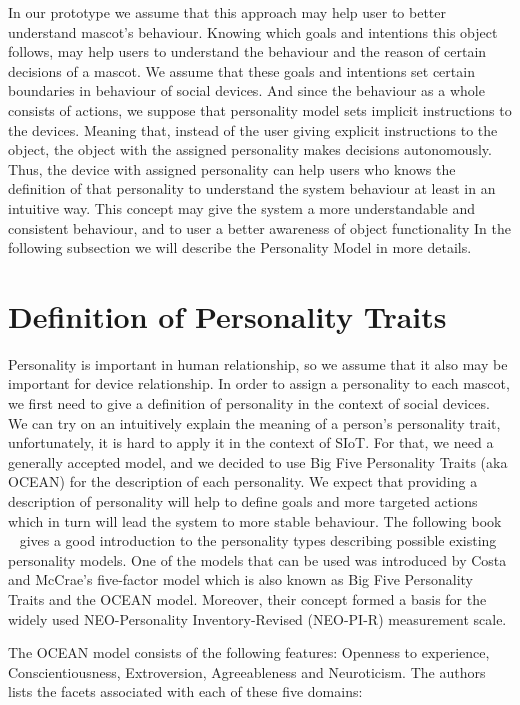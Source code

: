 In our prototype we assume that this approach may help user to better understand mascot's behaviour.
Knowing which goals and intentions this object follows, may help users to understand the
behaviour and the reason of certain decisions of a mascot.
We assume that these goals and intentions set certain boundaries in behaviour of social devices.
And since the behaviour as a whole consists of actions, we suppose that personality
model sets implicit instructions to the devices.
Meaning that, instead of the user giving explicit instructions to the object,
the object with the assigned personality makes decisions autonomously.
Thus, the device with assigned personality can help users who knows the definition
of that personality to understand the system behaviour at least in an intuitive way.
This concept may give the system a more understandable and consistent behaviour,
and to user a better awareness of object functionality
In the following subsection we will describe the Personality Model in more details.

\section{Definition of Personality Traits}
\label{sec:Definition of Personality Traits}

Personality is important in human relationship, so we assume that it also may be important for device relationship.
In order to assign a personality to each mascot, we first need to give a definition of
personality in the context of social devices.
We can try on an intuitively explain the meaning of a person’s personality trait,
unfortunately, it is hard to apply it in the context of SIoT. For that, we need a generally
accepted model, and we decided to use Big Five Personality Traits (aka OCEAN) for the description of each personality.
We expect that providing a description of personality will help to define goals and
more targeted actions which in turn will lead the system to more stable behaviour.
The following book ~\cite{matthews2003personality} gives a good introduction to the
personality types describing possible existing personality models.
One of the models that can be used was introduced by Costa and McCrae’s five-factor
model which is also known as Big Five Personality Traits and the OCEAN model.
Moreover, their concept formed a basis for the widely used NEO-Personality
Inventory-Revised (NEO-PI-R) measurement scale.

\par The OCEAN model consists of the following features: Openness to experience,
Conscientiousness, Extroversion, Agreeableness and Neuroticism.
The authors lists the facets associated with each of these five domains:

